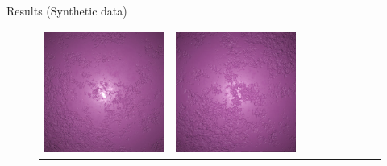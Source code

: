 \documentclass[final]{beamer}
\newlength{\twocolwid}
\newlength{\resultwidth}
\begin{document}
\begin{frame}[t]
\begin{columns}[t]
\begin{column}{\twocolwid}
\begin{block}{Results (Synthetic data)}
\begin{figure}[t]
\begin{tabular}{ccrclcccc}
            		\includegraphics[width=\resultwidth]{images/synth/plaster/good1.jpg} &
            		\includegraphics[width=\resultwidth]{images/synth/plaster/good2.jpg} &

\end{tabular}
\end{figure}
\end{block}
\end{column}
\end{columns}
\end{frame}
\end{document}
